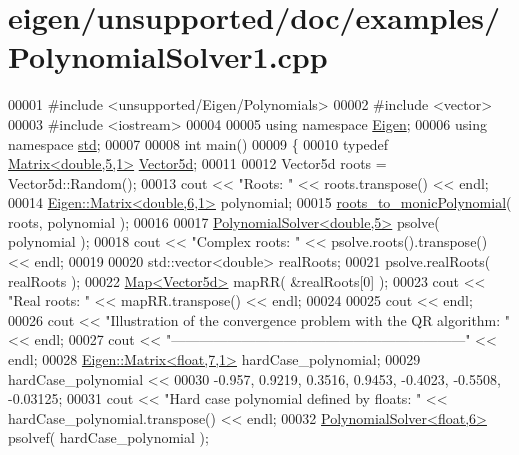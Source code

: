 \hypertarget{eigen_2unsupported_2doc_2examples_2_polynomial_solver1_8cpp_source}{}\section{eigen/unsupported/doc/examples/\+Polynomial\+Solver1.cpp}
\label{eigen_2unsupported_2doc_2examples_2_polynomial_solver1_8cpp_source}

\begin{DoxyCode}
00001 \textcolor{preprocessor}{#include <unsupported/Eigen/Polynomials>}
00002 \textcolor{preprocessor}{#include <vector>}
00003 \textcolor{preprocessor}{#include <iostream>}
00004 
00005 \textcolor{keyword}{using namespace }\hyperlink{namespace_eigen}{Eigen};
00006 \textcolor{keyword}{using namespace }\hyperlink{namespacestd}{std};
00007 
00008 \textcolor{keywordtype}{int} main()
00009 \{
00010   \textcolor{keyword}{typedef} \hyperlink{group___core___module_class_eigen_1_1_matrix}{Matrix<double,5,1>} \hyperlink{group___core___module_class_eigen_1_1_matrix}{Vector5d};
00011 
00012   Vector5d roots = Vector5d::Random();
00013   cout << \textcolor{stringliteral}{"Roots: "} << roots.transpose() << endl;
00014   \hyperlink{group___core___module_class_eigen_1_1_matrix}{Eigen::Matrix<double,6,1>} polynomial;
00015   \hyperlink{namespace_eigen_afbc3648f7ef67db3d5d04454fc1257fd}{roots\_to\_monicPolynomial}( roots, polynomial );
00016 
00017   \hyperlink{class_eigen_1_1_polynomial_solver}{PolynomialSolver<double,5>} psolve( polynomial );
00018   cout << \textcolor{stringliteral}{"Complex roots: "} << psolve.roots().transpose() << endl;
00019 
00020   std::vector<double> realRoots;
00021   psolve.realRoots( realRoots );
00022   \hyperlink{group___core___module_class_eigen_1_1_map}{Map<Vector5d>} mapRR( &realRoots[0] );
00023   cout << \textcolor{stringliteral}{"Real roots: "} << mapRR.transpose() << endl;
00024 
00025   cout << endl;
00026   cout << \textcolor{stringliteral}{"Illustration of the convergence problem with the QR algorithm: "} << endl;
00027   cout << \textcolor{stringliteral}{"---------------------------------------------------------------"} << endl;
00028   \hyperlink{group___core___module_class_eigen_1_1_matrix}{Eigen::Matrix<float,7,1>} hardCase\_polynomial;
00029   hardCase\_polynomial <<
00030   -0.957, 0.9219, 0.3516, 0.9453, -0.4023, -0.5508, -0.03125;
00031   cout << \textcolor{stringliteral}{"Hard case polynomial defined by floats: "} << hardCase\_polynomial.transpose() << endl;
00032   \hyperlink{class_eigen_1_1_polynomial_solver}{PolynomialSolver<float,6>} psolvef( hardCase\_polynomial );

\end{DoxyCode}

